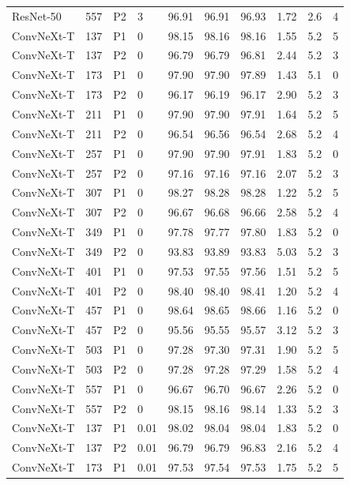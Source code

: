 {\begin{longtable}{lrllrrrrrr}
ResNet-50 & 557 & P2 & 3 & 96.91 & 96.91 & 96.93 & 1.72 & 2.6 & 4 \\
ConvNeXt-T & 137 & P1 & 0 & 98.15 & 98.16 & 98.16 & 1.55 & 5.2 & 5 \\
ConvNeXt-T & 137 & P2 & 0 & 96.79 & 96.79 & 96.81 & 2.44 & 5.2 & 3 \\
ConvNeXt-T & 173 & P1 & 0 & 97.90 & 97.90 & 97.89 & 1.43 & 5.1 & 0 \\
ConvNeXt-T & 173 & P2 & 0 & 96.17 & 96.19 & 96.17 & 2.90 & 5.2 & 3 \\
ConvNeXt-T & 211 & P1 & 0 & 97.90 & 97.90 & 97.91 & 1.64 & 5.2 & 5 \\
ConvNeXt-T & 211 & P2 & 0 & 96.54 & 96.56 & 96.54 & 2.68 & 5.2 & 4 \\
ConvNeXt-T & 257 & P1 & 0 & 97.90 & 97.90 & 97.91 & 1.83 & 5.2 & 0 \\
ConvNeXt-T & 257 & P2 & 0 & 97.16 & 97.16 & 97.16 & 2.07 & 5.2 & 3 \\
ConvNeXt-T & 307 & P1 & 0 & 98.27 & 98.28 & 98.28 & 1.22 & 5.2 & 5 \\
ConvNeXt-T & 307 & P2 & 0 & 96.67 & 96.68 & 96.66 & 2.58 & 5.2 & 4 \\
ConvNeXt-T & 349 & P1 & 0 & 97.78 & 97.77 & 97.80 & 1.83 & 5.2 & 0 \\
ConvNeXt-T & 349 & P2 & 0 & 93.83 & 93.89 & 93.83 & 5.03 & 5.2 & 3 \\
ConvNeXt-T & 401 & P1 & 0 & 97.53 & 97.55 & 97.56 & 1.51 & 5.2 & 5 \\
ConvNeXt-T & 401 & P2 & 0 & 98.40 & 98.40 & 98.41 & 1.20 & 5.2 & 4 \\
ConvNeXt-T & 457 & P1 & 0 & 98.64 & 98.65 & 98.66 & 1.16 & 5.2 & 0 \\
ConvNeXt-T & 457 & P2 & 0 & 95.56 & 95.55 & 95.57 & 3.12 & 5.2 & 3 \\
ConvNeXt-T & 503 & P1 & 0 & 97.28 & 97.30 & 97.31 & 1.90 & 5.2 & 5 \\
ConvNeXt-T & 503 & P2 & 0 & 97.28 & 97.28 & 97.29 & 1.58 & 5.2 & 4 \\
ConvNeXt-T & 557 & P1 & 0 & 96.67 & 96.70 & 96.67 & 2.26 & 5.2 & 0 \\
ConvNeXt-T & 557 & P2 & 0 & 98.15 & 98.16 & 98.14 & 1.33 & 5.2 & 3 \\
ConvNeXt-T & 137 & P1 & 0.01 & 98.02 & 98.04 & 98.04 & 1.83 & 5.2 & 0 \\
ConvNeXt-T & 137 & P2 & 0.01 & 96.79 & 96.79 & 96.83 & 2.16 & 5.2 & 4 \\
ConvNeXt-T & 173 & P1 & 0.01 & 97.53 & 97.54 & 97.53 & 1.75 & 5.2 & 5 \\

\end{longtable}}
